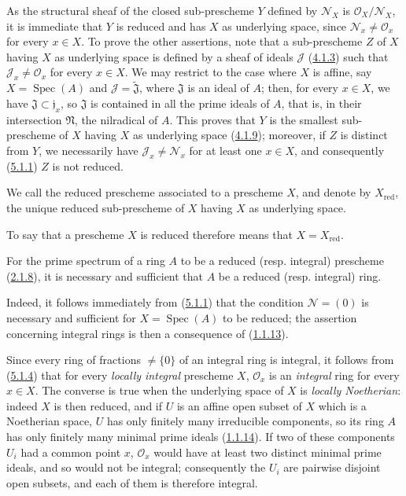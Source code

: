 As the structural sheaf of the closed sub-prescheme $Y$ defined by
$\mathscr{N}_X$ is $\mathscr{O}_X/\mathscr{N}_X$, it is immediate that $Y$
is reduced and has $X$ as underlying space, since
$\mathscr{N}_x\ne\mathscr{O}_x$ for every $x\in X$. To prove the other
assertions, note that a sub-prescheme $Z$ of $X$ having $X$ as underlying
space is defined by a sheaf of ideals $\mathscr{J}$
(\hyperref[I.4.1.3]{4.1.3}) such that
$\mathscr{J}_x\ne\mathscr{O}_x$ for every $x\in X$. We may restrict to the case
where $X$ is affine, say $X=\operatorname{Spec}(A)$ and
$\mathscr{J}=\widetilde{\mathfrak{J}}$, where $\mathfrak{J}$ is an ideal of
$A$; then, for every $x\in X$, we have
$\mathfrak{J}\subset\mathfrak{j}_x$, so $\mathfrak{J}$ is contained in
all the prime ideals of $A$, that is, in their intersection
$\mathfrak{N}$, the nilradical of $A$. This proves that $Y$ is the smallest
sub-prescheme of $X$ having $X$ as underlying space
(\hyperref[I.4.1.9]{4.1.9}); moreover, if $Z$ is distinct from $Y$, we
necessarily have $\mathscr{J}_x\ne\mathscr{N}_x$ for at least one $x\in X$,
and consequently (\hyperref[I.5.1.1]{5.1.1}) $Z$ is not reduced.

\begin{definition}[5.1.3]
\label{I.5.1.3}
We call the reduced prescheme associated to a prescheme $X$, and denote by
$X_{\mathrm{red}}$, the unique reduced sub-prescheme of $X$ having $X$ as
underlying space.
\end{definition}

To say that a prescheme $X$ is reduced therefore means that
$X=X_{\mathrm{red}}$.

\begin{proposition}[5.1.4]
\label{I.5.1.4}
For the prime spectrum of a ring $A$ to be a reduced (\textup{resp.}
integral) prescheme \textup{(\hyperref[I.2.1.8]{2.1.8})}, it is necessary and
sufficient that $A$ be a reduced (\textup{resp.} integral) ring.
\end{proposition}

Indeed, it follows immediately from (\hyperref[I.5.1.1]{5.1.1}) that the
condition $\mathscr{N}=(0)$ is necessary and sufficient for
$X=\operatorname{Spec}(A)$ to be reduced; the assertion concerning integral
rings is then a consequence of
(\hyperref[I.1.1.13]{1.1.13}).

Since every ring of fractions $\ne\{0\}$ of an integral ring is integral, it
follows from (\hyperref[I.5.1.4]{5.1.4}) that for every \emph{locally
integral} prescheme $X$, $\mathscr{O}_x$ is an \emph{integral} ring
for every $x\in X$. The converse is true when the underlying space of
$X$ is \emph{locally Noetherian}: indeed $X$ is then reduced, and if
$U$ is an affine open subset of $X$ which is a Noetherian space, $U$ has only
finitely many irreducible components, so its ring $A$ has only
finitely many minimal prime ideals
(\hyperref[I.1.1.14]{1.1.14}). If two of these components $U_i$ had a
common point $x$, $\mathscr{O}_x$ would have at least two distinct minimal
prime ideals, and so would not be integral; consequently the $U_i$ are
pairwise disjoint open subsets, and each of them is therefore integral.

